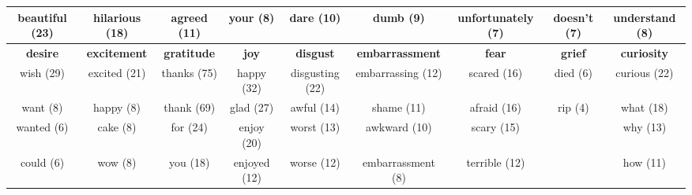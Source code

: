\documentclass[11pt,a4paper]{article}
\begin{document}
\begin{table*}[t!]
{\begin{centering}
\begin{tabular}{|cccc|ccccc|}
beautiful (23)                           & hilarious (18)                           & agreed (11)                             & your (8)                             & dare (10)                                 & dumb (9)                                    & unfortunately (7)                            & \multicolumn{1}{c|}{doesn't (7)}                               & understand (8)                        \\ \hline
\cellcolor[HTML]{BEECAF}\textbf{desire}     & \cellcolor[HTML]{BEECAF}\textbf{excitement} & \cellcolor[HTML]{BEECAF}\textbf{gratitude} & \cellcolor[HTML]{BEECAF}\textbf{joy}    & \cellcolor[HTML]{A6CBF7}\textbf{disgust}     & \cellcolor[HTML]{A6CBF7}\textbf{embarrassment} & \cellcolor[HTML]{A6CBF7}\textbf{fear}           & \multicolumn{1}{c|}{\cellcolor[HTML]{A6CBF7}\textbf{grief} }      & \cellcolor[HTML]{FFFC9E}\textbf{curiosity} \\
wish (29)                                & excited (21)                             & thanks (75)                             & happy (32)                           & disgusting (22)                           & embarrassing (12)                           & scared (16)                                  & \multicolumn{1}{c|}{died (6) }                                 & curious (22)                            \\
want (8)                                 & happy (8)                                & thank (69)                              & glad (27)                            & awful (14)                                & shame (11)                                  & afraid (16)                                  & \multicolumn{1}{c|}{rip (4)}                                   & what (18)                               \\
wanted (6)                               & cake (8)                                 & for (24)                                & enjoy (20)                           & worst (13)                                & awkward (10)                                & scary (15)                                   &\multicolumn{1}{c|}{}  & why (13)                                \\
could (6)                                & wow (8)                                  & you (18)                                & enjoyed (12)                         & worse (12)                                & embarrassment (8)                           & terrible (12)                                &      \multicolumn{1}{c|}{}                          & how (11)                                \\

\end{tabular}
\end{centering}}
\end{table*}
\end{document}
